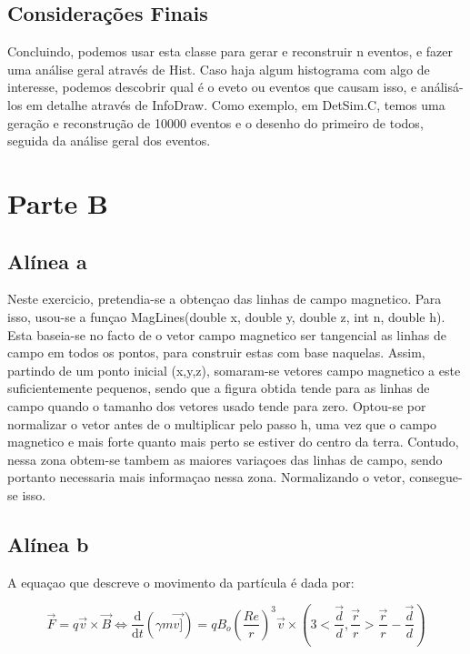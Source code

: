 \documentclass{article}
\begin{document}
\begin{multicols}{2}
\subsection{Considerações Finais}
	Concluindo, podemos usar esta classe para gerar e reconstruir n eventos, e fazer uma análise geral através de Hist. Caso haja algum histograma com algo de interesse, podemos descobrir qual é o eveto ou eventos que causam isso, e análisá-los em detalhe através de InfoDraw.
Como exemplo, em DetSim.C, temos uma geração e reconstrução de 10000 eventos e o desenho do primeiro de todos, seguida da análise geral dos eventos.
  \section{Parte B}
  \par  

 
\subsection{Alínea a}

Neste exercicio, pretendia-se a obtençao das linhas de campo magnetico. Para isso, usou-se a funçao MagLines(double x, double y, double z, int n, double h). Esta baseia-se no facto de o vetor campo magnetico ser tangencial as linhas de campo em todos os pontos, para construir estas com base naquelas. Assim, partindo de um ponto inicial (x,y,z), somaram-se vetores campo magnetico a este suficientemente pequenos, sendo que a figura obtida tende para as linhas de campo quando o tamanho dos vetores usado tende para zero. Optou-se por normalizar o vetor antes de o multiplicar pelo passo h, uma vez que o campo magnetico e mais forte quanto mais perto se estiver do centro da terra. Contudo, nessa zona obtem-se tambem as maiores variaçoes das linhas de campo, sendo portanto necessaria mais informaçao nessa zona. Normalizando o vetor, consegue-se isso.

\subsection{Alínea b}

A equaçao que descreve o movimento da partícula é dada por:

\begin{equation}
  \vec{F}=q\vec{v}\times\vec{B} \Leftrightarrow \frac{\mathrm{d} }{\mathrm{d} t}(\gamma m\vec{v]}) = qB_o(\frac{Re}{r})^3\vec{v}\times(3<\frac{\vec{d}}{d},\frac{\vec{r}}{r}>\frac{\vec{r}}{r}-\frac{\vec{d}}{d})
\end{equation}


\end{multicols}
\end{document}
